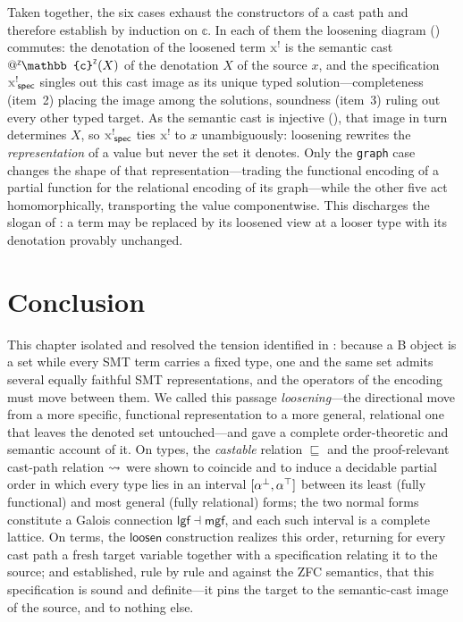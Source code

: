 Taken together, the six cases exhaust the constructors of a cast path and therefore establish  by induction on $\mathbb{c}$. In each of them the loosening diagram () commutes: the denotation of the loosened term $\lvar{x}$ is the semantic cast $\appZ\zop{\mathbb{c}}(X)$ of the denotation $X$ of the source $x$, and the specification $\spec{\lvar{x}}$ singles out this cast image as its unique typed solution---completeness (item~2) placing the image among the solutions, soundness (item~3) ruling out every other typed target. As the semantic cast is injective (), that image in turn determines $X$, so $\spec{\lvar{x}}$ ties $\lvar{x}$ to $x$ unambiguously: loosening rewrites the \emph{representation} of a value but never the set it denotes. Only the \texttt{graph} case changes the shape of that representation---trading the functional encoding of a partial function for the relational encoding of its graph---while the other five act homomorphically, transporting the value componentwise. This discharges the slogan of : a term may be replaced by its loosened view at a looser type with its denotation provably unchanged.

\ifThesisAfive\else{}\fi
\section{Conclusion}
\label{sec:loosening-conclusion}

This chapter isolated and resolved the tension identified in : because a B object is a set while every SMT term carries a fixed type, one and the same set admits several equally faithful SMT representations, and the operators of the encoding must move between them. We called this passage \emph{loosening}---the directional move from a more specific, functional representation to a more general, relational one that leaves the denoted set untouched---and gave a complete order-theoretic and semantic account of it. On types, the \emph{castable} relation $\sqsubseteq$ and the proof-relevant cast-path relation $ \rightsquigarrow $ were shown to coincide and to induce a decidable partial order in which every type lies in an interval $[{\alpha}^{\bot}, {\alpha}^{\top}]$ between its least (fully functional) and most general (fully relational) forms; the two normal forms constitute a Galois connection $\mathsf{lgf} \dashv \mathsf{mgf}$, and each such interval is a complete lattice. On terms, the $\mathsf{loosen}$ construction realizes this order, returning for every cast path a fresh target variable together with a specification relating it to the source; and  established, rule by rule and against the ZFC semantics, that this specification is sound and definite---it pins the target to the semantic-cast image of the source, and to nothing else.

